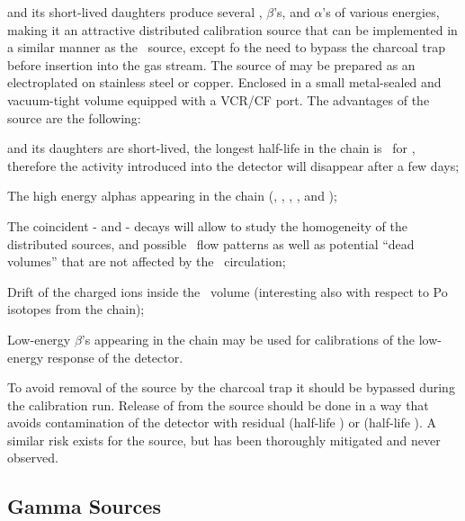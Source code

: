  and its short-lived daughters produce several \grs, $\beta$'s, and $\alpha$'s of various energies, making it an attractive distributed calibration source that can be implemented in a similar manner as the \Kr\ source, except fo the need to bypass the charcoal trap before insertion into the gas stream.  The source of  may be prepared as an electroplated  on stainless steel or copper.  Enclosed in a small metal-sealed and vacuum-tight volume equipped with a VCR/CF port.  The advantages of the  source are the following:

\begin{compactitem}
\item {} and its daughters are short-lived, the longest half-life in the chain is \BiTwoOneTwoHalfLife\ for , therefore the activity introduced into the detector will disappear after a few days;
\item The high energy alphas appearing in the chain (\BiTwoOneTwoAlphaTwoEnergy, \BiTwoOneTwoAlphaOneEnergy, \RnTwoTwoZeroAlphaEnergy, \PoTwoOneSixAlphaEnergy, and \PoTwoOneTwoAlphaEnergy);
\item The coincident - and - decays will allow to study the homogeneity of the distributed sources, and possible \LAr\ flow patterns as well as potential ``dead volumes'' that are not affected by the \LAr\ circulation;
\item Drift of the charged ions inside the \LAr\ volume (interesting also with respect to Po isotopes from the  chain);
\item Low-energy $\beta$'s appearing in the chain may be used for calibrations of the low-energy response of the detector.
\end{compactitem}

To avoid removal of the  source by the charcoal trap it should be bypassed during the calibration run.  Release of  from the source should be done in a way that avoids contamination of the detector with residual  (half-life \RaTwoTwoFourHalfLife) or  (half-life \ThTwoTwoEightHalfLife).  A similar risk exists for the  source, but has been thoroughly mitigated and never observed.


\subsection{Gamma Sources}

